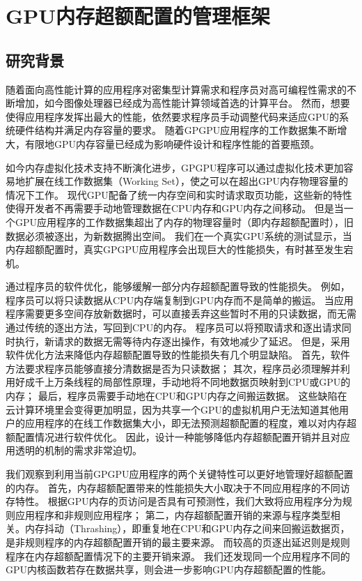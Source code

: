 \chapter{GPU内存超额配置的管理框架}
\label{chap:ETC}

\section{研究背景}

随着面向高性能计算的应用程序对密集型计算需求和程序员对高可编程性需求的不断增加，如今图像处理器已经成为高性能计算领域首选的计算平台。
然而，想要使得应用程序发挥出最大的性能，依然要求程序员手动调整代码来适应GPU的系统硬件结构并满足内存容量的要求。
随着GPGPU应用程序的工作数据集不断增大，有限地GPU内存容量已经成为影响硬件设计和程序性能的首要瓶颈。

如今内存虚拟化技术支持不断演化进步，GPGPU程序可以通过虚拟化技术更加容易地扩展在线工作数据集（Working Set），使之可以在超出GPU内存物理容量的情况下工作。
现代GPU配备了统一内存空间和实时请求取页功能，这些新的特性使得开发者不再需要手动地管理数据在CPU内存和GPU内存之间移动。
但是当一个GPU应用程序的工作数据集超出了内存的物理容量时（即内存超额配置时），旧数据必须被逐出，为新数据腾出空间。
我们在一个真实GPU系统的测试显示，当内存超额配置时，真实GPGPU应用程序会出现巨大的性能损失，有时甚至发生宕机。

通过程序员的软件优化，能够缓解一部分内存超额配置导致的性能损失。
例如，程序员可以将只读数据从CPU内存端复制到GPU内存而不是简单的搬运。
当应用程序需要更多空间存放新数据时，可以直接丢弃这些暂时不用的只读数据，而无需通过传统的逐出方法，写回到CPU的内存。
程序员可以将预取请求和逐出请求同时执行，新请求的数据无需等待内存逐出操作，有效地减少了延迟。
但是，采用软件优化方法来降低内存超额配置导致的性能损失有几个明显缺陷。
首先，软件方法要求程序员能够直接分清数据是否为只读数据；
其次，程序员必须理解并利用好成千上万条线程的局部性原理，手动地将不同地数据页映射到CPU或GPU的内存；
最后，程序员需要手动地在CPU和GPU内存之间搬运数据。
这些缺陷在云计算环境里会变得更加明显，因为共享一个GPU的虚拟机用户无法知道其他用户的应用程序的在线工作数据集大小，即无法预测超额配置的程度，难以对内存超额配置情况进行软件优化。
因此，设计一种能够降低内存超额配置开销并且对应用透明的机制的需求非常迫切。

我们观察到利用当前GPGPU应用程序的两个关键特性可以更好地管理好超额配置的内存。
首先，内存超额配置带来的性能损失大小取决于不同应用程序的不同访存特性。
根据GPU内存的页访问是否具有可预测性，我们大致将应用程序分为规则应用程序和非规则应用程序；
第二，内存超额配置开销的来源与程序类型相关。内存抖动（Thrashing），即重复地在CPU和GPU内存之间来回搬运数据页，是非规则程序的内存超额配置开销的最主要来源。
而较高的页逐出延迟则是规则程序在内存超额配置情况下的主要开销来源。
我们还发现同一个应用程序不同的GPU内核函数若存在数据共享，则会进一步影响GPU内存超额配置的性能。

